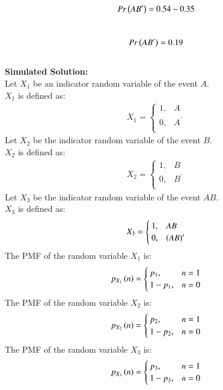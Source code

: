 \documentclass[journal]{IEEEtran}
\begin{document}
 \begin{align}
  Pr\left(AB'\right) = 0.54 - 0.35
 \end{align}\\
 \begin{align}
 Pr\left(AB'\right) = 0.19
 \end{align}\\
 \textbf{Simulated Solution:\\}
Let $X_1$ be an indicator random variable of the event $A$.\\
$X_1$ is defined as:
\begin{align}
	X_1 =
	\begin{cases}
		1 ,& A\\
		0 ,& A^\prime\\
	\end{cases}
\end{align}
Let $X_2$ be the indicator random variable of the event $B$.\\
$X_2$ is defined as:
\begin{align}
	X_2 =
	\begin{cases}
		1 ,& B\\
		0 ,& B^\prime\\
	\end{cases}
\end{align}
Let $X_3$ be the indicator random variable of the event $AB$.\\
$X_3$ is defined as:
\begin{align}
	X_3 =
	\begin{cases}
		1 ,& AB\\
		0 ,& \left(AB\right)^\prime\\
	\end{cases}
\end{align}
The PMF of the random variable $X_1$ is:
\begin{align}
	p_{X_1}\left(n\right) =
	\begin{cases}
		p_1 ,& n = 1\\
		1 - p_1 ,& n = 0
	\end{cases}
\end{align}
The PMF of the random variable $X_2$ is:
\begin{align}
	p_{X_2}\left(n\right) =
	\begin{cases}
		p_2 ,& n = 1\\
		1 - p_2 ,& n = 0
	\end{cases}
\end{align}
The PMF of the random variable $X_3$ is:
\begin{align}
	p_{X_3}\left(n\right) =
	\begin{cases}
		p_3 ,& n = 1\\
		1 - p_3 ,& n = 0
	\end{cases}
\end{align}
\end{document}
